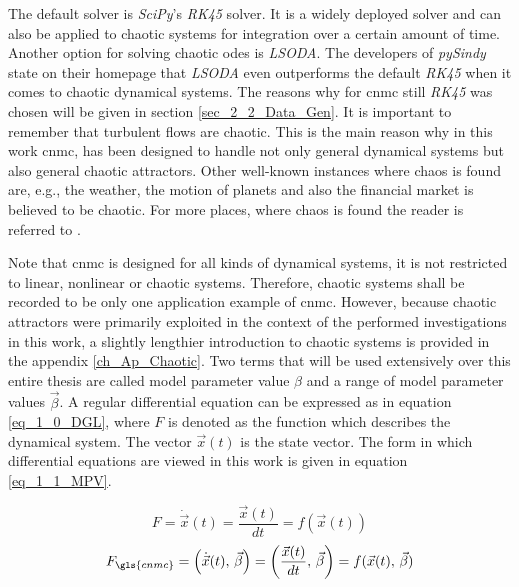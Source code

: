 The default solver is \emph{SciPy}'s \emph{RK45} solver.
It is a widely deployed solver and can also be applied to 
chaotic systems for integration 
over a certain amount of time.
Another option for solving chaotic \gls{ode}s is 
\emph{LSODA}. The developers of \emph{pySindy} \cite{Silva2020, Kaptanoglu2022} 
state on their homepage \cite{pysindy_Home} that 
\emph{LSODA} even outperforms the default \emph{RK45} when it comes to chaotic dynamical systems. The reasons why for \gls{cnmc} still \emph{RK45} was chosen will be given in
section 
\ref{sec_2_2_Data_Gen}. 
It is important to remember that turbulent flows are chaotic.
This is the main reason why in this work \gls{cnmc}, has been designed to handle not only general dynamical systems but also general chaotic attractors.
Other well-known instances where chaos is found are, e.g., the weather, the 
motion of planets and also the financial market is believed to be chaotic.
For more places, where chaos is found the reader is referred to \cite{Argyris2017}.\newline 

Note that \gls{cnmc} is designed for all kinds of dynamical systems, it is not restricted to linear, nonlinear or chaotic systems. 
Therefore, chaotic systems shall be recorded to be only one application example of \gls{cnmc}.
However, because chaotic attractors were primarily exploited in the context of the performed investigations in this work, a slightly lengthier introduction to chaotic systems is provided in the appendix \ref{ch_Ap_Chaotic}.
Two terms that will be used extensively over this entire thesis are called model parameter value $\beta$ and a range of model parameter values $\vec{\beta}$. A regular differential equation can be expressed as 
in equation \eqref{eq_1_0_DGL}, where $F$ is denoted as the function which describes the dynamical system. 
The vector $\vec{x}(t)$ is the state vector. 
The form in which differential equations are viewed in this work is given in equation \eqref{eq_1_1_MPV}.

\begin{equation}
    F = \dot{\vec{x}}(t) = \frac{\vec{x}(t)}{dt} = f(\vec{x}(t))
    \label{eq_1_0_DGL}
\end{equation}
\begin{equation}
    F_{\gls{cnmc}} = \left(\dot{\vec{x}}(t), \, \vec{\beta} \right) = 
    \left( \frac{\vec{x}(t)}{dt}, \, \vec{\beta} \right) =
     f(\vec{x}(t), \, \vec{\beta} )
    \label{eq_1_1_MPV}
\end{equation}

